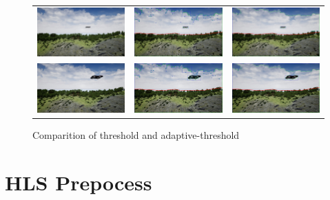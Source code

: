 \begin{figure}
\begin{tabular}{ccc}
    \includegraphics[width=.27\linewidth]{images/airsim_thresh/img_12.jpg} &
    \includegraphics[width=.27\linewidth]{images/airsim_thresh/img_adaptive_12.jpg} &
    \includegraphics[width=.27\linewidth]{images/airsim_thresh/img_thresh_12.jpg} \\
    
    \includegraphics[width=.27\linewidth]{images/airsim_thresh/img_13.jpg} &
    \includegraphics[width=.27\linewidth]{images/airsim_thresh/img_adaptive_13.jpg} &
    \includegraphics[width=.27\linewidth]{images/airsim_thresh/img_thresh_13.jpg} \\
    \end{tabular}
    \caption{Comparition of threshold and adaptive-threshold}
    \label{fig:thresh_compar}
\end{figure}
\clearpage

\section{HLS Prepocess} %

